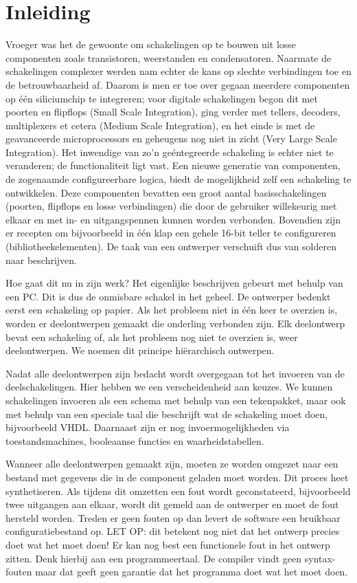 \documentclass[a4paper,12pt,fleqn,twoside]{book}
\begin{document}
\chapter{Inleiding}
\label{chap:inleiding}
Vroeger was het de gewoonte om schakelingen op te bouwen uit losse componenten
zoals transistoren, weerstanden en condensatoren. Naarmate de schakelingen
complexer werden nam echter de kans op slechte verbindingen toe en de
betrouwbaarheid af. Daarom is men er toe over gegaan meerdere componenten op
\'{e}\'{e}n siliciumchip te integreren; voor digitale schakelingen begon dit
met poorten en flipflops (Small Scale Integration), ging verder  met tellers,
decoders, multiplexers et cetera (Medium Scale Integration), en het einde is
met de geavanceerde microprocessors en geheugens nog niet in zicht (Very Large
Scale Integration). Het inwendige van zo'n ge\'{e}ntegreerde schakeling is
echter niet te veranderen; de functionaliteit ligt vast. Een nieuwe generatie
van componenten, de zogenaamde configureerbare logica, biedt de mogelijkheid
zelf een schakeling te ontwikkelen. Deze componenten bevatten een groot aantal
basisschakelingen (poorten, flipflops en losse verbindingen) die door de
gebruiker willekeurig met elkaar en met in- en uitgangspennen kunnen worden
verbonden. Bovendien zijn er recepten om bijvoorbeeld in \'{e}\'{e}n klap een
gehele 16-bit teller te configureren (bibliotheekelementen). De taak van een
ontwerper verschuift dus van solderen naar beschrijven.

Hoe gaat dit nu in zijn werk? Het eigenlijke beschrijven gebeurt met behulp van
een PC. Dit is dus de onmisbare schakel in het geheel. De ontwerper bedenkt
eerst een schakeling op papier. Als het probleem niet in \'{e}\'{e}n keer te
overzien  is, worden er deelontwerpen gemaakt die onderling verbonden zijn. Elk
deelontwerp bevat een schakeling of, als het probleem nog niet te overzien 
is, weer deelontwerpen. We noemen dit principe hi\"{e}rarchisch ontwerpen.

Nadat alle deelontwerpen zijn bedacht wordt overgegaan tot het invoeren van de
deelschakelingen. Hier hebben we een verscheidenheid aan keuzes. We kunnen
schakelingen invoeren als een schema met behulp van een tekenpakket, maar ook
met behulp van een speciale taal die beschrijft wat de schakeling moet doen,
bijvoorbeeld VHDL. Daarnaast zijn er nog invoermogelijkheden via
toestandsmachines, booleaanse functies en waarheidstabellen.

Wanneer alle deelontwerpen gemaakt zijn, moeten ze worden omgezet naar een
bestand met gegevens die in de component geladen moet worden. Dit proces heet
synthetiseren. Als tijdens dit omzetten een fout wordt geconstateerd,
bijvoorbeeld twee uitgangen aan elkaar, wordt dit gemeld aan de ontwerper en
moet de fout hersteld worden. Treden er geen fouten op dan levert de software
een bruikbaar configuratiebestand op. LET OP: dit betekent nog niet dat het
ontwerp precies doet wat het moet doen! Er kan nog best een functionele fout
in het ontwerp zitten. Denk hierbij aan een programmeertaal. De compiler vindt
geen syntax-fouten maar dat geeft geen garantie dat het programma doet wat het
moet doen.
\end{document}
